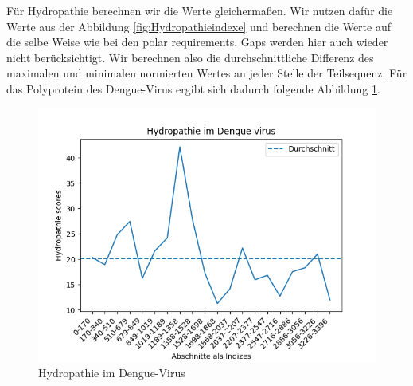 \documentclass[german,version-2022-01]{uzl-thesis}
\begin{document}
F\"ur Hydropathie berechnen wir die Werte gleicherma\ss{}en. Wir nutzen daf\"ur die Werte aus der Abbildung \ref{fig:Hydropathieindexe} und berechnen die Werte auf die selbe Weise wie bei den polar requirements. Gaps werden hier auch wieder nicht ber\"ucksichtigt. Wir berechnen also die durchschnittliche Differenz des maximalen und minimalen normierten Wertes an jeder Stelle der Teilsequenz. F\"ur das Polyprotein des Dengue-Virus ergibt sich dadurch folgende Abbildung \ref{fig:Dengue_virus_hydropathy}. 
\begin{figure}[htpb]
  \centering
  \includegraphics[scale=0.75]{Images/Diagramm_Hydropathie_im_Dengue_virus.png}
  \caption{Hydropathie im Dengue-Virus}
  \label{fig:Dengue_virus_hydropathy}
\end{figure}
\end{document}
